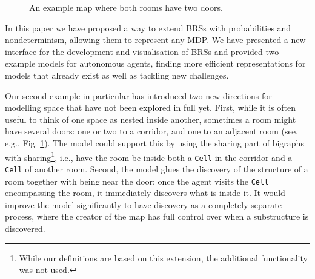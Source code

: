 \documentclass[runningheads]{llncs}
\begin{document}
\begin{figure}
  \centering
  \caption{An example map where both rooms have two doors.}
  \label{multiple_doors}
\end{figure}

In this paper we have proposed a way to extend BRSs with probabilities and
nondeterminism, allowing them to represent any MDP. We have presented a new
interface for the development and visualisation of BRSs and provided two
example models for autonomous agents, finding more efficient representations for
models that already exist as well as tackling new challenges.

Our second example in particular has introduced two new directions for modelling
space that have not been explored in full yet. First, while it is often useful
to think of one space as nested inside another, sometimes a room might have
several doors: one or two to a corridor, and one to an adjacent room (see, e.g.,
Fig. \ref{multiple_doors}). The model could support this by using the sharing
part of bigraphs with sharing\footnote{While our definitions are based on this
  extension, the additional functionality was not used.}, i.e., have the room be
inside both a \texttt{Cell} in the corridor and a \texttt{Cell} of another room.
Second, the model glues the discovery of the structure of a room together with
being near the door: once the agent visits the \texttt{Cell} encompassing the
room, it immediately discovers what is inside it. It would improve the model
significantly to have discovery as a completely separate process, where the
creator of the map has full control over when a substructure is discovered.
\end{document}
